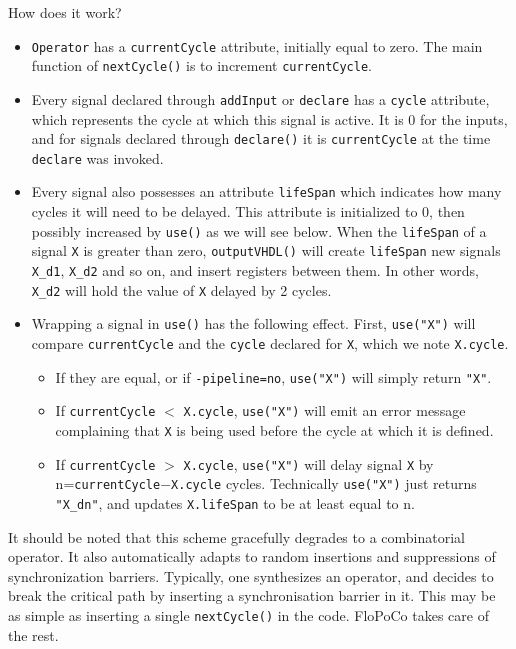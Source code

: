 \documentclass{article}
\begin{document}
How does it work? 
\begin{itemize}\item 
  \verb!Operator! has a \verb!currentCycle! attribute, initially equal to
  zero. The main function of 	\verb!nextCycle()! is to increment \verb!currentCycle!.

\item Every signal declared through \verb!addInput! or \verb!declare!
  has a \verb!cycle! attribute, which represents the cycle at which
  this signal is active. It is 0 for the inputs, and for signals
  declared through \verb!declare()! it is \verb!currentCycle!  at the
  time \verb!declare! was invoked.

\item Every signal also possesses an attribute \verb!lifeSpan! which
  indicates how many cycles it will need to be delayed. This attribute
  is initialized to 0, then possibly increased by \verb!use()! as we
  will see below. When the \verb!lifeSpan! of a signal \verb!X!  is
  greater than zero, \verb!outputVHDL()! will create \verb!lifeSpan!
  new signals \verb!X_d1!, \verb!X_d2! and so on, and insert registers
  between them. In other words, \verb!X_d2! will hold the value of
  \verb!X! delayed by 2 cycles.

\item Wrapping a signal in \verb!use()! has the following  effect. First,
  \verb!use("X")! will compare \verb!currentCycle! and the
  \verb!cycle! declared for \verb!X!, which we note \verb!X.cycle!. 
  \begin{itemize}\item 
    If they are equal, or if \verb!-pipeline=no!, \verb!use("X")! will
    simply return \verb!"X"!.
  \item If \verb!currentCycle! $<$ \verb!X.cycle!, \verb!use("X")!
    will emit an error message complaining that \verb!X! is being
    used before the cycle at which it is defined.
  \item If \verb!currentCycle! $>$ \verb!X.cycle!, \verb!use("X")!
    will delay signal \verb!X! by
    n=\verb!currentCycle!$-$\verb!X.cycle! cycles. Technically
    \verb!use("X")! just returns \verb!"X_dn"!, and updates \verb!X.lifeSpan! to be at least equal to n.
  \end{itemize}
\end{itemize}

It should be noted that this scheme gracefully degrades to a
combinatorial operator. It also automatically adapts to random
insertions and suppressions of synchronization barriers. Typically,
one synthesizes an operator, and decides to break the critical path by
inserting a synchronisation barrier in it. This may be as simple as
inserting a single \verb!nextCycle()! in the code. FloPoCo takes care of the rest.
\end{document}
